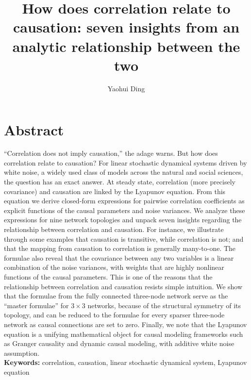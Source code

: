 \documentclass[12pt]{article}
\title{How does correlation relate to causation: seven insights from an analytic relationship between the two}
\author{Yaohui Ding}
\begin{document}
\maketitle



\section*{Abstract}

``Correlation does not imply causation,'' the adage warns.
But how does correlation relate to causation?
For linear stochastic dynamical systems driven by white
noise, a widely used class of models across the natural and
social sciences, the question has an exact answer.
At steady state, correlation (more precisely covariance) and causation are linked by the
Lyapunov equation. From this equation we derive closed-form expressions for pairwise correlation coefficients as explicit
functions of the causal parameters and noise variances. We analyze these expressions for nine network topologies and unpack seven insights regarding the relationship between correlation and causation. For instance, we illustrate through some examples that causation is transitive, while correlation is not; and that the mapping from causation to correlation is generally many-to-one. The formulae also reveal that the covariance
between any two variables is a linear combination of the
noise variances, with weights that are
highly nonlinear functions of the causal parameters. This is one of the reasons that
the relationship between correlation and causation resists simple
intuition. We show that the formulae from the
fully connected three-node network serve as the ``master
formulae'' for $3\times3$ networks, because of the structural
symmetry of its topology, and can be reduced to the formulae for
every sparser three-node network as causal connections are
set to zero. Finally, we note that the Lyapunov equation is a unifying  mathematical object for causal modeling
frameworks such as Granger causality and dynamic causal modeling, with additive white noise assumption. \\

\noindent\textbf{Keywords:} correlation, causation, linear stochastic dynamical system, Lyapunov equation




\end{document}

